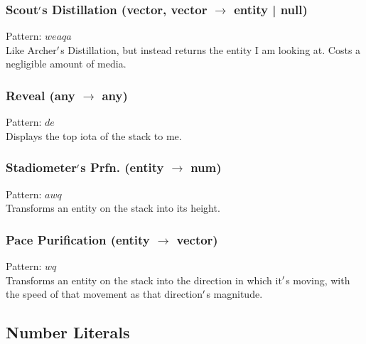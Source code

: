 \documentclass[12pt]{article}
\begin{document}
  \label{sec: patterns/basics@hexcasting:raycast/entity}
\subsubsection*{Scout$\rq$s Distillation (vector, vector $\rightarrow$ entity | null)}

    Pattern: $weaqa$\\
      Like Archer$\rq$s Distillation, but instead returns the entity I am looking at. Costs a negligible amount of media.\\


  \label{sec: patterns/basics@hexcasting:print}
\subsubsection*{Reveal (any $\rightarrow$ any)}

    Pattern: $de$\\
      Displays the top iota of the stack to me.\\


  \label{sec: patterns/basics@hexcasting:get_entity_height}
\subsubsection*{Stadiometer$\rq$s Prfn. (entity $\rightarrow$ num)}

    Pattern: $awq$\\
      Transforms an entity on the stack into its height.\\


  \label{sec: patterns/basics@hexcasting:get_entity_velocity}
\subsubsection*{Pace Purification (entity $\rightarrow$ vector)}

    Pattern: $wq$\\
      Transforms an entity on the stack into the direction in which it$\rq$s moving, with the speed of that movement as that direction$\rq$s magnitude.\\

\newpage

\label{sec:patterns/numbers}
\subsection*{Number Literals}


  \label{sec: patterns/numbers@Numbers}
\end{document}
